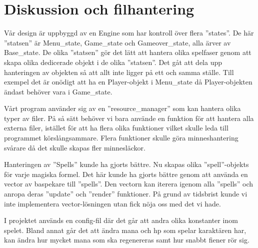 \documentclass[12pt]{TDP005mall}
\begin{document}
\section{Diskussion och filhantering}
Vår design är uppbyggd av en Engine som har kontroll över flera ''states''. De här ''statsen'' är Menu\_state, Game\_state och Gameover\_state, alla ärver av Base\_state. De olika ''statsen'' gör det lätt att hantera olika spelfaser genom att skapa olika dedicerade objekt i de olika ''statsen''. Det gåt att dela upp hanteringen av objekten så att allt inte ligger på ett och samma ställe. Till exempel det är onödigt att ha en Player-objekt i Menu\_state då Player-objekten ändast behöver vara i Game\_state.

Vårt program använder sig av en ''resource\_manager'' som kan hantera olika typer av filer. På så sätt behöver vi bara använde en funktion för att hantera alla externa filer, istället för att ha flera olika funktioner vilket skulle leda till programmet körslångsammare. Flera funktioner skulle göra minneshantering svårare då det skulle skapas fler minnesläckor. 

Hanteringen av ''Spells'' kunde ha gjorts bättre. Nu skapas olika ''spell''-objekts för varje magiska formel. Det här kunde ha gjorts bättre genom att använda en vector av baspekare till ''spells''. Den vectorn kan iterera igenom alla ''spells'' och anropa deras ''update'' och ''render''  funktioner. På grund av tidsbrist kunde vi inte implementera vector-lösningen utan fick nöja oss med det vi hade.

I projektet används en config-fil där det går att andra olika konstanter inom spelet. Bland annat går det att ändra mana och hp som spelar karaktären har, kan ändra hur mycket mana som ska regenereras samt hur snabbt fiener rör sig. 

\newpage
\end{document}
